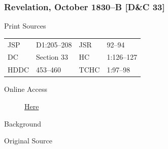 		\subsubsection{Revelation, October 1830--B [D\&C 33]}
			\label{EMS-1830-JS-OCT-1830-B}
		
			\begin{description}
				\item[Print Sources]
			\end{description}

				\begin{tabular}{p{0.5in}p{1in}p{0.5in}p{1in}}
				JSP	 	& D1:205--208	& JSR 		& 92--94	 \\
				DC	 	& Section 33	& HC 		& 1:126--127 \\
				HDDC 	& 453--460		& TCHC 		& 1:97--98 \\
				\end{tabular}
			
			\begin{description}
				\item[Online Access] \href{https://www.josephsmithpapers.org/paper-summary/revelation-october-1830-b-dc-33/1}{Here}
			\end{description}
			
			\begin{description}
				\item[Background]
			\end{description}
			
			
			\begin{description}
				\item[Original Source]
			\end{description}
			
			
